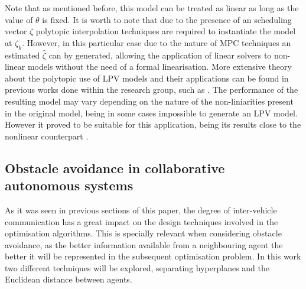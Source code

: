 \documentclass[a4paper,fleqn]{cas-sc}
\begin{document}
Note that as mentioned before, this model can be treated as linear as long as the value of $\theta$ is fixed. It is worth to note that due to the presence of an scheduling vector $\zeta$ polytopic interpolation techniques are required to instantiate the model at ${\zeta_k}$. However, in this particular case due to the nature of MPC techniques an estimated ${\hat{\zeta}}$ can by generated, allowing the application of linear solvers to non-linear models without the need of a formal linearisation. More extensive theory about the polytopic use of LPV models and their applications can be found in previous works done within the research group, such as \cite{facerias2022zonotopic}. The performance of the resulting model may vary depending on the nature of the non-liniarities present in the original model, being in some cases impossible to generate an LPV model. However it proved to be suitable for this application, being its results close to the nonlinear counterpart \cite{alcala2019lpv}.

\subsection{Obstacle avoidance in collaborative autonomous systems}
    \label{sec:obs_avoidance}

    As it was seen in previous sections of this paper, the degree of inter-vehicle communication has a great impact on the design techniques involved in the optimisation algorithms. This is specially relevant when considering obstacle avoidance, as the better information available from a neighbouring agent the better it will be represented in the subsequent optimisation problem. In this work two different techniques will be explored, separating hyperplanes and the Euclidean distance between agents.\\
    
\end{document}
